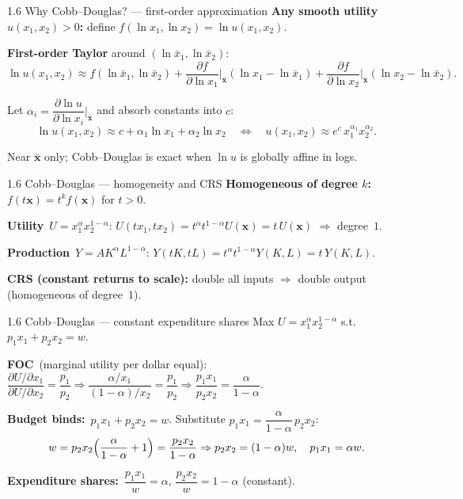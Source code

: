 \documentclass[11pt,aspectratio=169]{beamer}
\begin{document}
\begin{frame}{1.6 Why Cobb--Douglas? --- first-order approximation}
  \small
  \textbf{Any smooth utility $u(x_1,x_2)>0$:}\quad
  define $f(\ln x_1,\ln x_2)=\ln u(x_1,x_2)$.

  \medskip
  \textbf{First-order Taylor} around $(\ln\bar x_1,\ln\bar x_2)$:
  \[
    \ln u(x_1,x_2)
    \approx
    f(\ln\bar x_1,\ln\bar x_2)
    +\frac{\partial f}{\partial\ln x_1}\Big|_{\bar{\mathbf{x}}}(\ln x_1-\ln\bar x_1)
    +\frac{\partial f}{\partial\ln x_2}\Big|_{\bar{\mathbf{x}}}(\ln x_2-\ln\bar x_2).
  \]

  \medskip
  Let $\alpha_i=\dfrac{\partial\ln u}{\partial\ln x_i}\Big|_{\bar{\mathbf{x}}}$
  and absorb constants into $c$:
  \[
    \ln u(x_1,x_2)\approx c+\alpha_1\ln x_1+\alpha_2\ln x_2
    \quad\Leftrightarrow\quad
    u(x_1,x_2)\approx e^c\,x_1^{\alpha_1}x_2^{\alpha_2}.
  \]

  \medskip
  {\scriptsize Near $\bar{\mathbf{x}}$ only; Cobb--Douglas is exact when $\ln u$ is globally affine in logs.}
\end{frame}

\begin{frame}{1.6 Cobb--Douglas --- homogeneity and CRS}
  \scriptsize
  \textbf{Homogeneous of degree $k$:}\quad
  $f(t\mathbf{x})=t^k f(\mathbf{x})$ for $t>0$.

  \medskip
  \textbf{Utility}\ $U=x_1^{\alpha}x_2^{1-\alpha}$:\quad
  $U(tx_1,tx_2)=t^{\alpha}t^{1-\alpha}U(\mathbf{x})=t\,U(\mathbf{x})$
  $\Rightarrow$ degree~$1$.

  \medskip
  \textbf{Production}\ $Y=A K^{\alpha}L^{1-\alpha}$:\quad
  $Y(tK,tL)=t^{\alpha}t^{1-\alpha}Y(K,L)=t\,Y(K,L)$.

  \medskip
  \textbf{CRS (constant returns to scale):}\quad
  double all inputs $\Rightarrow$ double output (homogeneous of degree~$1$).
\end{frame}

\begin{frame}{1.6 Cobb--Douglas --- constant expenditure shares}
  \scriptsize
  Max $U=x_1^{\alpha}x_2^{1-\alpha}$ s.t.\ $p_1x_1+p_2x_2=w$.

  \medskip
  \textbf{FOC}\ (marginal utility per dollar equal):
  $\dfrac{\partial U/\partial x_1}{\partial U/\partial x_2}=\dfrac{p_1}{p_2}
  \Rightarrow \dfrac{\alpha/x_1}{(1-\alpha)/x_2}=\dfrac{p_1}{p_2}
  \Rightarrow \dfrac{p_1x_1}{p_2x_2}=\dfrac{\alpha}{1-\alpha}$.

  \medskip
  \textbf{Budget binds:}\ $p_1x_1+p_2x_2=w$.
  Substitute $p_1x_1=\dfrac{\alpha}{1-\alpha}\,p_2x_2$:
  \[
    w=p_2x_2\Bigl(\frac{\alpha}{1-\alpha}+1\Bigr)=\frac{p_2x_2}{1-\alpha}
    \Rightarrow p_2x_2=(1-\alpha)w,\quad p_1x_1=\alpha w.
  \]

  \medskip
  \textbf{Expenditure shares:}\ $\dfrac{p_1x_1}{w}=\alpha$,
  $\dfrac{p_2x_2}{w}=1-\alpha$ (constant).
\end{frame}
\end{document}
